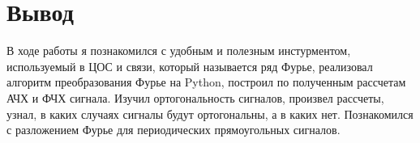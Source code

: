 \chapter{Вывод}
\label{ch:сhap5}

В ходе работы я познакомился с удобным и полезным инстурментом, используемый в ЦОС и связи, который называется ряд Фурье, реализовал
алгоритм преобразования Фурье на Python, построил по полученным рассчетам АЧХ и ФЧХ сигнала. Изучил ортогональность сигналов, произвел 
рассчеты, узнал, в каких случаях сигналы будут ортогональны, а в каких нет. Познакомился с разложением Фурье для периодических
прямоугольных сигналов.


\endinput